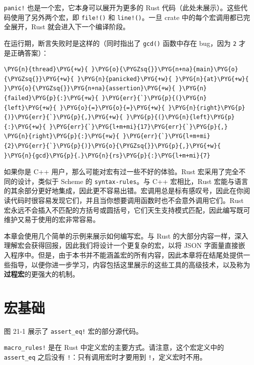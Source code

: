 \texttt{panic!} 也是一个宏，它本身可以展开为更多的 Rust 代码（此处未展示）。这些代码使用了另外两个宏，即 \texttt{file!()} 和 \texttt{line!()}。一旦 crate 中的每个宏调用都已完全展开，Rust 就会进入下一个编译阶段。

在运行期，断言失败时是这样的（同时指出了 \texttt{gcd()} 函数中存在 bug，因为 \texttt{2} 才是正确答案）：

\begin{Verbatim}[commandchars=\\\{\},breaklines=true,breakanywhere=true,fontsize=\codefont,xleftmargin=17bp]
\PYG{n}{thread}\PYG{+w}{ }\PYG{o}{\PYGZsq{}}\PYG{n+na}{main}\PYG{o}{\PYGZsq{}}\PYG{+w}{ }\PYG{n}{panicked}\PYG{+w}{ }\PYG{n}{at}\PYG{+w}{ }\PYG{o}{\PYGZsq{}}\PYG{n+na}{assertion}\PYG{+w}{ }\PYG{n}{failed}\PYG{p}{:}\PYG{+w}{ }\PYG{err}{`}\PYG{p}{(}\PYG{n}{left}\PYG{+w}{ }\PYG{o}{=}\PYG{o}{=}\PYG{+w}{ }\PYG{n}{right}\PYG{p}{)}\PYG{err}{`}\PYG{p}{,}\PYG{+w}{ }\PYG{p}{(}\PYG{n}{left}\PYG{p}{:}\PYG{+w}{ }\PYG{err}{`}\PYG{l+m+mi}{17}\PYG{err}{`}\PYG{p}{,}
\PYG{n}{right}\PYG{p}{:}\PYG{+w}{ }\PYG{err}{`}\PYG{l+m+mi}{2}\PYG{err}{`}\PYG{p}{)}\PYG{o}{\PYGZsq{}}\PYG{p}{,}\PYG{+w}{ }\PYG{n}{gcd}\PYG{p}{.}\PYG{n}{rs}\PYG{p}{:}\PYG{l+m+mi}{7}
\end{Verbatim}

如果你是 C++ 用户，那么可能对宏有过一些不好的体验。Rust 宏采用了完全不同的设计，类似于 Scheme 的 \texttt{syntax-rules}。与 C++ 宏相比，Rust 宏能与语言的其余部分更好地集成，因此更不容易出错。宏调用总是标有感叹号，因此在你阅读代码时很容易发现它们，并且当你想要调用函数时也不会意外调用它们。Rust 宏永远不会插入不匹配的方括号或圆括号，它们天生支持模式匹配，因此编写既可维护又易于使用的宏非常容易。

本章会使用几个简单的示例来展示如何编写宏。与 Rust 的大部分内容一样，深入理解宏会获得回报，因此我们将设计一个更复杂的宏，以将 JSON 字面量直接嵌入程序中。但是，由于本书并不能涵盖宏的所有内容，因此本章将在结尾处提供一些指导，以便你进一步学习，内容包括这里展示的这些工具的高级技术，以及称为\textbf{过程宏}的更强大的机制。

\section{宏基础}

图 21-1 展示了 \texttt{assert\_eq!} 宏的部分源代码。


\texttt{macro\_rules!} 是在 Rust 中定义宏的主要方式。请注意，这个宏定义中的 \texttt{assert\_eq} 之后没有 \texttt{!}：只有调用宏时才要用到 \texttt{!}，定义宏时不用。

